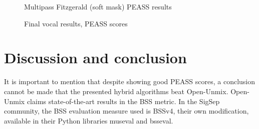 \documentclass[letter,12pt]{article}
\begin{document}
\begin{figure}[ht]
	\centering
	\caption{Multipass Fitzgerald (soft mask) PEASS results}
	\label{fig:vocalround1soft}
	\vspace{1em}
	\caption{Final vocal results, PEASS scores}
	\label{fig:finalvocal}
\end{figure}

\vfill
\clearpage %

\section{Discussion and conclusion}

It is important to mention that despite showing good PEASS scores, a conclusion cannot be made that the presented hybrid algorithms beat Open-Unmix. Open-Unmix claims state-of-the-art results \cite{umxsota} in the BSS metric. In the SigSep community, the BSS evaluation measure used is BSSv4, their own modification, available in their Python libraries museval\cite{museval} and bsseval\cite{bsseval}.
\end{document}
